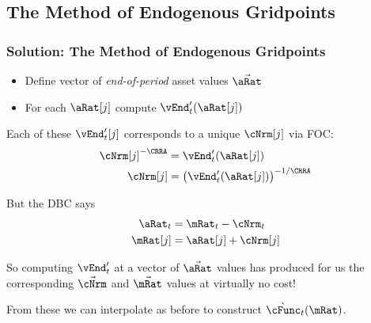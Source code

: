 \documentclass{beamer}
\begin{document}
\subsection{The Method of Endogenous Gridpoints}
\begin{frame}
\frametitle{Solution: The Method of Endogenous Gridpoints}

\pause 

\begin{itemize}
\item Define vector of {\it end-of-period} asset values $\vec{\aRat}$
\item For each $\aRat[j]$ compute $\vEnd_{t}^{\prime}(\aRat[j])$
\end{itemize}

\pause 

Each of these $\vEnd_{t}^{\prime}[j]$ corresponds to a unique
$\cNrm[j]$ via FOC:
\begin{equation}\begin{gathered}\begin{aligned}
  \cNrm[j]^{-\CRRA}  & = \vEnd_{t}^{\prime}(\aRat[j])
\\ \cNrm[j]  & = \left(\vEnd_{t}^{\prime}(\aRat[j])\right)^{-1/\CRRA}
\end{aligned}\end{gathered}\end{equation}

\pause 

But the DBC says
\begin{equation}\begin{gathered}\begin{aligned}
  \aRat_{t}  & = \mRat_{t} - \cNrm_{t}
\\ \mRat[j]  & = \aRat[j]+\cNrm[j]
\end{aligned}\end{gathered}\end{equation}

\pause 
So computing $\vEnd_{t}^{\prime}$ at a vector of $\vec{\aRat}$ values has produced for us the corresponding $\vec{\cNrm}$ and $\vec{\mRat}$ 
values at virtually no cost!  

\pause 
\medskip 
From these we can interpolate as before to construct $\grave{\cFunc}_{t}(\mRat)$.

\end{frame}
\end{document}
